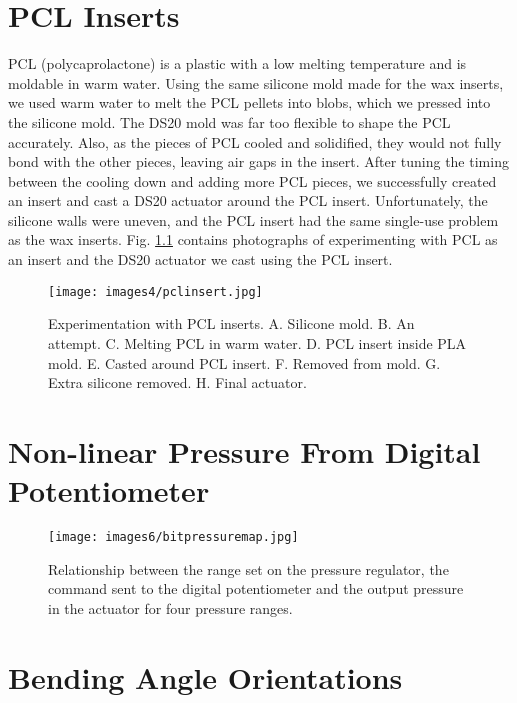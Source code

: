 \appendix

\chapter{PCL Inserts}
\label{appendix:pcl}

PCL (polycaprolactone) is a plastic with a low melting temperature and is moldable in warm water. Using the same silicone mold made for the wax inserts, we used warm water to melt the PCL pellets into blobs, which we pressed into the silicone mold. The DS20 mold was far too flexible to shape the PCL accurately. Also, as the pieces of PCL cooled and solidified, they would not fully bond with the other pieces, leaving air gaps in the insert. After tuning the timing between the cooling down and adding more PCL pieces, we successfully created an insert and cast a DS20 actuator around the PCL insert. Unfortunately, the silicone walls were uneven, and the PCL insert had the same single-use problem as the wax inserts. Fig. \ref{fig:pclinsert} contains photographs of experimenting with PCL as an insert and the DS20 actuator we cast using the PCL insert.

\begin{figure}[!ht]
    \centering
    \texttt{[image: images4/pclinsert.jpg]}
    \caption{Experimentation with PCL inserts. A. Silicone mold. B. An attempt. C. Melting PCL in warm water. D. PCL insert inside PLA mold. E. Casted around PCL insert. F. Removed from mold. G. Extra silicone removed. H. Final actuator.}
    \label{fig:pclinsert}
\end{figure}

\chapter{Non-linear Pressure From Digital Potentiometer}
\label{appendix:bitmap}

\begin{figure}[!ht]
    \centering
    \texttt{[image: images6/bitpressuremap.jpg]}
    \caption{Relationship between the range set on the pressure regulator, the command sent to the digital potentiometer and the output pressure in the actuator for four pressure ranges.}
\end{figure}

\chapter{Bending Angle Orientations}
\label{appendix:ao}

